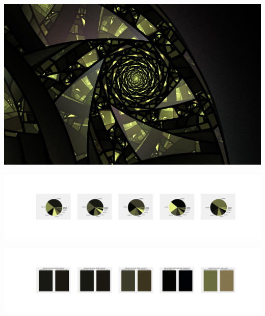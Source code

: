 \documentclass[11pt]{article}
\begin{document}
\begin{landscape}
    \begin{center}
    \includegraphics[width=\textwidth]{./nbimg/file (36).jpg}
    \end{center}

    \begin{center}
    \includegraphics[width=250mm]{./nbimg/pie-289.jpg}
    \end{center}

    \begin{center}
    \includegraphics[width=250mm]{./nbimg/peak-289.jpg}
    \end{center}
    


\end{landscape}
\end{document}
